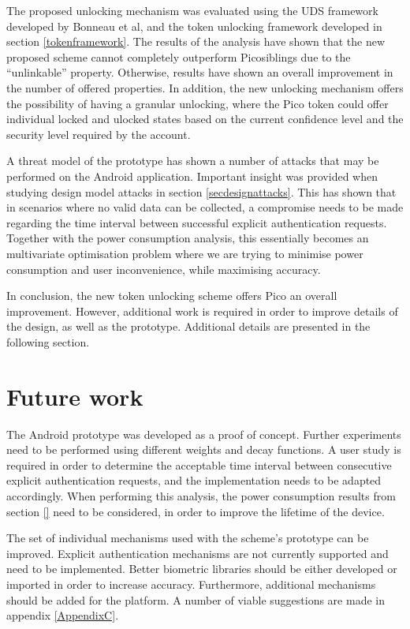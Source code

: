 The proposed unlocking mechanism was evaluated using the UDS framework developed by Bonneau et al, and the token unlocking framework developed in section \ref{tokenframework}. The results of the analysis have shown that the new proposed scheme cannot completely outperform Picosiblings due to the ``unlinkable'' property. Otherwise, results have shown an overall improvement in the number of offered properties. In addition, the new unlocking mechanism offers the possibility of having a granular unlocking, where the Pico token could offer individual locked and ulocked states based on the current confidence level and the security level required by the account.

A threat model of the prototype has shown a number of attacks that may be performed on the Android application. Important insight was provided when studying design model attacks in section \ref{secdesignattacks}. This has shown that in scenarios where no valid data can be collected, a compromise needs to be made regarding the time interval between successful explicit authentication requests. Together with the power consumption analysis, this essentially becomes an multivariate optimisation problem where we are trying to minimise power consumption and user inconvenience, while maximising accuracy.

In conclusion, the new token unlocking scheme offers Pico an overall improvement. However, additional work is required in order to improve details of the design, as well as the prototype. Additional details are presented in the following section. 

\section*{Future work}
The Android prototype was developed as a proof of concept. Further experiments need to be performed using different weights and decay functions. A user study is required in order to determine the acceptable time interval between consecutive explicit authentication requests, and the implementation needs to be adapted accordingly. When performing this analysis, the power consumption results from section \ref{} need to be considered, in order to improve the lifetime of the device.


The set of individual mechanisms used with the scheme's prototype can be improved. Explicit authentication mechanisms are not currently supported and need to be implemented. Better biometric libraries should be either developed or imported in order to increase accuracy. Furthermore, additional mechanisms should be added for the platform. A number of viable suggestions are made in appendix \ref{AppendixC}.

